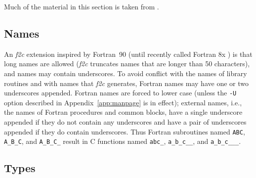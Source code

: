 \documentclass[10pt,a4paper]{article}
\begin{document}
Much of the material in this section is taken from \citep{6}.

\subsection*{Names}

An \emph{f2c} extension inspired by Fortran~90 (until recently called Fortran 8x \citep{2}) is that long names are allowed (\emph{f2c} truncates names that are longer than 50 characters), and names may contain underscores. To avoid conflict with the names of library routines and with names that \emph{f2c} generates, Fortran names may have one or two underscores appended. Fortran names are forced to lower case (unless the \verb|-U| option described in Appendix~\ref{app:manpage} is in effect); external names, i.e., the names of Fortran procedures and common blocks, have a single underscore appended if they do not contain any underscores and have a pair of underscores appended if they do contain underscores. Thus Fortran subroutines named \verb|ABC|, \verb|A_B_C|, and \verb|A_B_C_| result in C functions named \verb|abc_|, \verb|a_b_c__|, and \verb|a_b_c___|.

\subsection*{Types}
\end{document}
